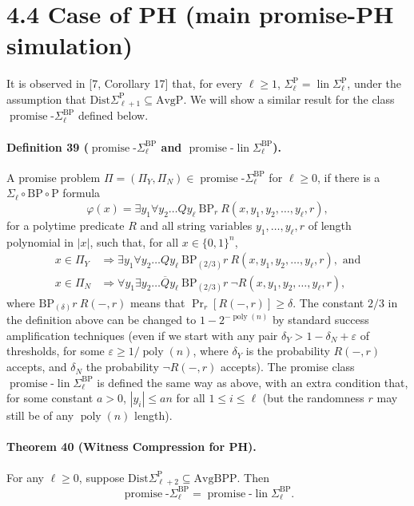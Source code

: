 \section*{4.4 Case of PH (main promise-PH simulation)}
It is observed in [7, Corollary 17] that, for every $\ell\geq1$, $\Sigma_\ell^{\mathrm P}=\operatorname{lin}\Sigma_\ell^{\mathrm P}$, under the assumption that $\mathrm{Dist}\Sigma_{\ell+1}^{\mathrm P}\subseteq\mathrm{AvgP}$. We will show a similar result for the class $\operatorname{promise}\text{-}\Sigma_\ell^{\mathrm{BP}}$ defined below.
\paragraph{Definition 39 ($\operatorname{promise}\text{-}\Sigma_\ell^{\mathrm{BP}}$ and $\operatorname{promise}\text{-}\operatorname{lin}\Sigma_\ell^{\mathrm{BP}}$).} A promise problem $\Pi=(\Pi_Y,\Pi_N)\in\operatorname{promise}\text{-}\Sigma_\ell^{\mathrm{BP}}$ for $\ell\geq0$, if there is a $\Sigma_\ell\circ\mathrm{BP}\circ\mathrm P$ formula
\[\varphi(x)=\exists y_1\forall y_2\ldots Qy_\ell\ \mathrm{BP}_r\ R(x,y_1,y_2,\ldots,y_\ell,r),\]
for a polytime predicate $R$ and all string variables $y_1,\ldots,y_\ell,r$ of length polynomial in $|x|$, such that, for all $x\in\{0,1\}^n$,
\begin{align*}
x\in\Pi_Y&\Longrightarrow\exists y_1\forall y_2\ldots Qy_\ell\ \mathrm{BP}_{(2/3)}r\ R(x,y_1,y_2,\ldots,y_\ell,r),\text{ and}\\
x\in\Pi_N&\Longrightarrow\forall y_1\exists y_2\ldots\overline Qy_\ell\ \mathrm{BP}_{(2/3)}r\ \neg R(x,y_1,y_2,\ldots,y_\ell,r),
\end{align*}
where $\mathrm{BP}_{(\delta)}r\ R(-,r)$ means that $\Pr_r[R(-,r)]\geq\delta$. The constant $2/3$ in the definition above can be changed to $1-2^{-\operatorname{poly}(n)}$ by standard success amplification techniques (even if we start with any pair $\delta_Y>1-\delta_N+\varepsilon$ of thresholds, for some $\varepsilon\geq1/\operatorname{poly}(n)$, where $\delta_Y$ is the probability $R(-,r)$ accepts, and $\delta_N$ the probability $\neg R(-,r)$ accepts).
The promise class $\operatorname{promise}\text{-}\operatorname{lin}\Sigma_\ell^{\mathrm{BP}}$ is defined the same way as above, with an extra condition that, for some constant $a>0$, $|y_i|\leq an$ for all $1\leq i\leq\ell$ (but the randomness $r$ may still be of any $\operatorname{poly}(n)$ length).
\paragraph{Theorem 40 (Witness Compression for PH).} For any $\ell\geq0$, suppose $\mathrm{Dist}\Sigma_{\ell+2}^{\mathrm P}\subseteq\mathrm{AvgBPP}$. Then
\[\operatorname{promise}\text{-}\Sigma_\ell^{\mathrm{BP}}=\operatorname{promise}\text{-}\operatorname{lin}\Sigma_\ell^{\mathrm{BP}}.\]

